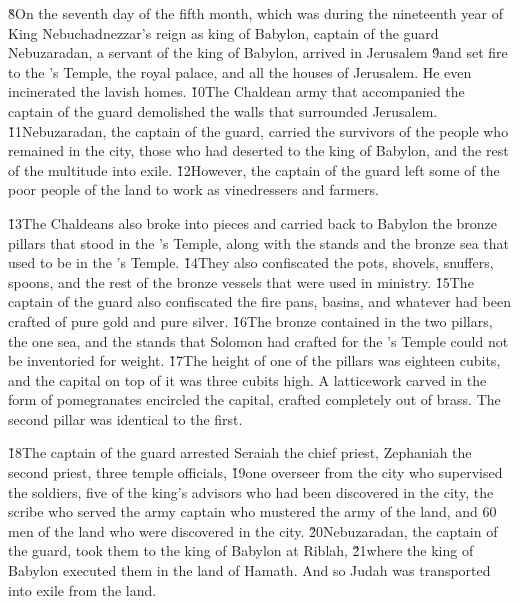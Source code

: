 \v{8}On the seventh day of the fifth month, which was during the nineteenth year of King Nebuchadnezzar's reign as king of Babylon, captain of the guard Nebuzaradan, a servant of the king of Babylon, arrived in Jerusalem \v{9}and set fire to the 's Temple, the royal palace, and all the houses of Jerusalem. He even incinerated the lavish homes. \v{10}The Chaldean army that accompanied the captain of the guard demolished the walls that surrounded Jerusalem. \v{11}Nebuzaradan, the captain of the guard, carried the survivors of the people who remained in the city, those who had deserted to the king of Babylon, and the rest of the multitude into exile. \v{12}However, the captain of the guard left some of the poor people of the land to work as vinedressers and farmers.

\v{13}The Chaldeans also broke into pieces and carried back to Babylon the bronze pillars that stood in the 's Temple, along with the stands and the bronze sea that used to be in the 's Temple. \v{14}They also confiscated the pots, shovels, snuffers, spoons, and the rest of the bronze vessels that were used in ministry. \v{15}The captain of the guard also confiscated the fire pans, basins, and whatever had been crafted of pure gold and pure silver. \v{16}The bronze contained in the two pillars, the one sea, and the stands that Solomon had crafted for the 's Temple could not be inventoried for weight. \v{17}The height of one of the pillars was eighteen cubits, and the capital on top of it was three cubits high. A latticework carved in the form of pomegranates encircled the capital, crafted completely out of brass. The second pillar was identical to the first.

\v{18}The captain of the guard arrested Seraiah the chief priest, Zephaniah the second priest, three temple officials, \v{19}one overseer from the city who supervised the soldiers, five of the king's advisors who had been discovered in the city, the scribe who served the army captain who mustered the army of the land, and 60 men of the land who were discovered in the city. \v{20}Nebuzaradan, the captain of the guard, took them to the king of Babylon at Riblah, \v{21}where the king of Babylon executed them in the land of Hamath. And so Judah was transported into exile from the land.

